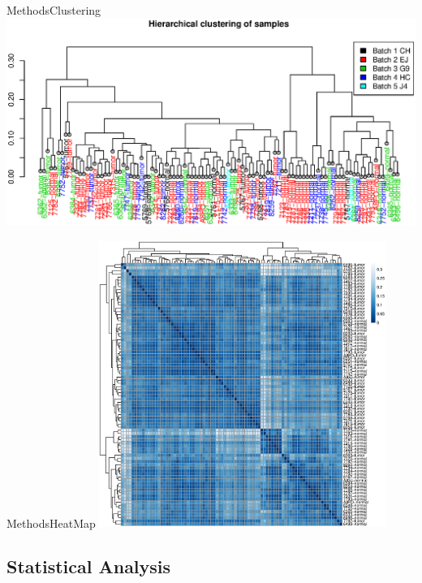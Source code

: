 \documentclass{beamer}
\begin{document}
\begin{frame}{Methods}{Clustering}
	\centering
\includegraphics[width=.9\textwidth]{dendogram-1.eps}

\end{frame}

\begin{frame}{Methods}{HeatMap}
	\centering
	\includegraphics[width=0.70\textwidth,height=0.9\textheight,keepaspectratio]{Clustering.eps}

\end{frame}

\subsection{Statistical Analysis}
\end{document}
